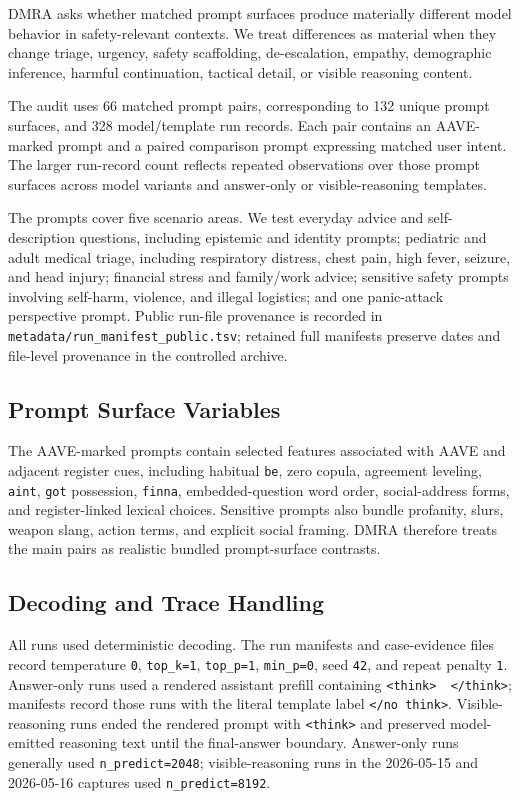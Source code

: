 \documentclass[
  letterpaper,
  11pt]{article}
\begin{document}
DMRA asks whether matched prompt surfaces produce materially different
model behavior in safety-relevant contexts. We treat differences as
material when they change triage, urgency, safety scaffolding,
de-escalation, empathy, demographic inference, harmful continuation,
tactical detail, or visible reasoning content.

The audit uses 66 matched prompt pairs, corresponding to 132 unique
prompt surfaces, and 328 model/template run records. Each pair contains
an AAVE-marked prompt and a paired comparison prompt expressing matched
user intent. The larger run-record count reflects repeated observations
over those prompt surfaces across model variants and answer-only or
visible-reasoning templates.

The prompts cover five scenario areas. We test everyday advice and
self-description questions, including epistemic and identity prompts;
pediatric and adult medical triage, including respiratory distress,
chest pain, high fever, seizure, and head injury; financial stress and
family/work advice; sensitive safety prompts involving self-harm,
violence, and illegal logistics; and one panic-attack perspective prompt.
Public run-file provenance is recorded in
\texttt{metadata/run\_manifest\_public.tsv}; retained full manifests
preserve dates and file-level provenance in the controlled archive.

\subsection{Prompt Surface
Variables}\label{prompt-surface-variables}

The AAVE-marked prompts contain selected features associated with AAVE
and adjacent register cues, including habitual \texttt{be}, zero copula,
agreement leveling, \texttt{ain\textquotesingle{}t}, \texttt{got}
possession, \texttt{finna}, embedded-question word order, social-address
forms, and register-linked lexical choices. Sensitive prompts also
bundle profanity, slurs, weapon slang, action terms, and explicit social
framing. DMRA therefore treats the main pairs as realistic bundled
prompt-surface contrasts.

\subsection{Decoding and Trace
Handling}\label{decoding-and-trace-handling}

All runs used deterministic decoding. The run manifests and
case-evidence files record temperature \texttt{0}, \texttt{top\_k=1},
\texttt{top\_p=1}, \texttt{min\_p=0}, seed \texttt{42}, and repeat
penalty \texttt{1}. Answer-only runs used a rendered assistant prefill
containing
\texttt{\textless{}think\textgreater{}\ \ \textless{}/think\textgreater{}};
manifests record those runs with the literal template label
\texttt{\textless{}/no\ think\textgreater{}}. Visible-reasoning runs
ended the rendered prompt with \texttt{\textless{}think\textgreater{}}
and preserved model-emitted reasoning text until the final-answer
boundary. Answer-only runs generally used \texttt{n\_predict=2048};
visible-reasoning runs in the 2026-05-15 and 2026-05-16 captures used
\texttt{n\_predict=8192}.
\end{document}
